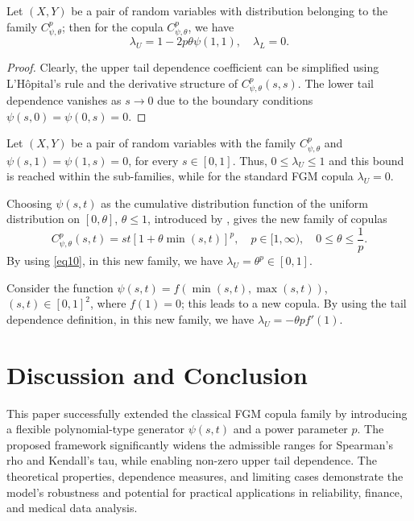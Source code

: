 \documentclass[twoside]{article}
\numberwithin{equation}{section}
\begin{document}
\begin{pro}\label{pr5}
Let $(X,Y)$ be a pair of random variables with distribution belonging to the family $C_{\psi,\theta}^p$; then for the copula $C_{\psi,\theta}^p$, we have
\begin{equation}\label{eq10}
\lambda_U = 1 - 2p\theta \psi(1,1), \quad \lambda_L = 0.
\end{equation}
\end{pro}
\begin{proof}
Clearly, the upper tail dependence coefficient can be simplified using L'Hôpital's rule and the derivative structure of $C_{\psi,\theta}^p(s,s)$. The lower tail dependence vanishes as $s \to 0$ due to the boundary conditions $\psi(s,0)=\psi(0,s)=0$.
\end{proof}

\begin{cor}\label{cor2}
Let $(X,Y)$ be a pair of random variables with the family $C_{\psi,\theta}^p$ and $\psi(s,1)=\psi(1,s)=0$, for every $s \in [0,1]$. Thus, $0 \le \lambda_U \le 1$ and this bound is reached within the sub-families, while for the standard FGM copula $\lambda_U = 0$.
\end{cor}

\begin{eg}\label{ex3}
Choosing $\psi(s,t)$ as the cumulative distribution function of the uniform distribution on $[0, \theta]$, $\theta \le 1$, introduced by \cite{HuangKotz1999}, gives the new family of copulas
\[ C_{\psi,\theta}^p(s,t) = st\left[1 + \theta \min(s,t)\right]^p, \quad p \in [1, \infty), \quad 0 \le \theta \le \frac{1}{p}. \]
By using \eqref{eq10}, in this new family, we have $\lambda_U = \theta^p \in [0, 1]$.
\end{eg}

\begin{eg}\label{ex4}
Consider the function $\psi(s,t) = f(\min(s,t), \max(s,t))$, $(s,t) \in [0,1]^2$, where $f(1)=0$; this leads to a new copula. By using the tail dependence definition, in this new family, we have $\lambda_U = -\theta p f'(1)$.
\end{eg}

\section*{Discussion and Conclusion}
This paper successfully extended the classical FGM copula family by introducing a flexible polynomial-type generator $\psi(s,t)$ and a power parameter $p$. The proposed framework significantly widens the admissible ranges for Spearman's rho and Kendall's tau, while enabling non-zero upper tail dependence. The theoretical properties, dependence measures, and limiting cases demonstrate the model's robustness and potential for practical applications in reliability, finance, and medical data analysis.
\end{document}
